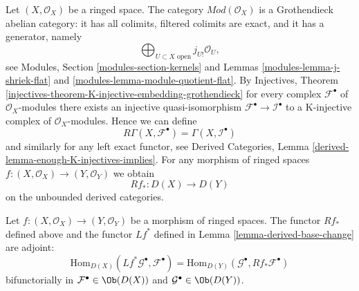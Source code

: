 \noindent
Let $(X, \mathcal{O}_X)$ be a ringed space.
The category $\textit{Mod}(\mathcal{O}_X)$ is a Grothendieck
abelian category: it has all colimits,
filtered colimits are exact, and it has a generator, namely
$$
\bigoplus\nolimits_{U \subset X\text{ open}} j_{U!}\mathcal{O}_U,
$$
see Modules, Section \ref{modules-section-kernels} and
Lemmas \ref{modules-lemma-j-shriek-flat} and
\ref{modules-lemma-module-quotient-flat}.
By
Injectives, Theorem
\ref{injectives-theorem-K-injective-embedding-grothendieck}
for every complex $\mathcal{F}^\bullet$ of $\mathcal{O}_X$-modules
there exists an injective quasi-isomorphism
$\mathcal{F}^\bullet \to \mathcal{I}^\bullet$ to a K-injective complex
of $\mathcal{O}_X$-modules. Hence we can define
$$
R\Gamma(X, \mathcal{F}^\bullet) = \Gamma(X, \mathcal{I}^\bullet)
$$
and similarly for any left exact functor, see
Derived Categories, Lemma \ref{derived-lemma-enough-K-injectives-implies}.
For any morphism of
ringed spaces $f : (X, \mathcal{O}_X) \to (Y, \mathcal{O}_Y)$ we obtain
$$
Rf_* : D(X) \longrightarrow D(Y)
$$
on the unbounded derived categories.

\begin{lemma}
\label{lemma-adjoint}
Let $f : (X, \mathcal{O}_X) \to (Y, \mathcal{O}_Y)$ be a morphism of
ringed spaces. The functor $Rf_*$ defined above and the functor $Lf^*$
defined in Lemma \ref{lemma-derived-base-change} are adjoint:
$$
\text{Hom}_{D(X)}(Lf^*\mathcal{G}^\bullet, \mathcal{F}^\bullet)
=
\text{Hom}_{D(Y)}(\mathcal{G}^\bullet, Rf_*\mathcal{F}^\bullet)
$$
bifunctorially in $\mathcal{F}^\bullet \in \Ob(D(X))$ and
$\mathcal{G}^\bullet \in \Ob(D(Y))$.
\end{lemma}

